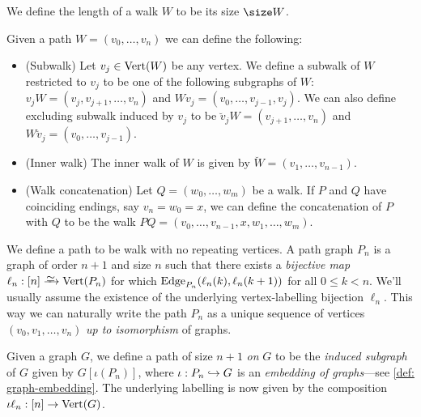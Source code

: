 \begin{definition}[Length]\label{def: walk-length}
We define the length of a walk \(W\) to be its size \(\size W\).
\end{definition}

\begin{definition}\label{def: walk-operations}
Given a path \(W = (v_0, \dots, v_n)\) we can define the following:
\begin{itemize}
  \setlength\itemsep{0.0em}
  \item (Subwalk) Let \(v_j \in \operatorname{Vert}(W)\) be any vertex. We define a subwalk of
    \(W\) restricted to \(v_j\) to be one of the following subgraphs of \(W\):
    \(v_jW = (v_j, v_{j+1}, \dots, v_n)\) and \(Wv_j = (v_0, \dots, v_{j-1},
    v_j)\). We can also define excluding subwalk induced by \(v_j\) to be
    \(\breve v_j W = (v_{j+1}, \dots, v_n)\) and \(W \breve v_j = (v_0, \dots,
    v_{j-1})\).
  \item (Inner walk) The inner walk of \(W\) is given by \(\breve W = (v_1,
    \dots, v_{n-1})\).
  \item (Walk concatenation) Let \(Q = (w_0, \dots, w_m)\) be a walk.
    If \(P\) and \(Q\) have coinciding endings, say \(v_n = w_0 = x\), we can
    define the concatenation of \(P\) with \(Q\) to be the walk \(PQ = (v_0,
    \dots, v_{n-1}, x, w_1, \dots, w_m)\).
\end{itemize}
\end{definition}

\begin{definition}[Path]\label{def: path}
We define a path to be walk with no repeating vertices. A path graph \(P_n\)
is a graph of order \(n + 1\) and size \(n\) such that there exists a
\emph{bijective map} \(\ell_n: [n] \isoto \Vertex(P_n)\) for which
\(\operatorname{Edge}_{P_n}(\ell_n(k), \ell_n(k+1))\) for all \(0 \leq k < n\). We'll usually
assume the existence of the underlying vertex-labelling bijection \(\ell_n\).
This way we can naturally write the path \(P_n\) as a unique sequence of
vertices \((v_0, v_1, \dots, v_n)\) \emph{up to isomorphism} of graphs.

Given a graph \(G\), we define a path of size \(n + 1\) \emph{on} \(G\) to be
the \emph{induced subgraph} of \(G\) given by \(G[\iota(P_n)]\), where
\(\iota: P_n \hookrightarrow G\) is an \emph{embedding of graphs}---see \cref{def:
graph-embedding}. The underlying labelling is now given by the composition
\(\iota \ell_n: [n] \to \operatorname{Vert}(G)\).
\end{definition}

